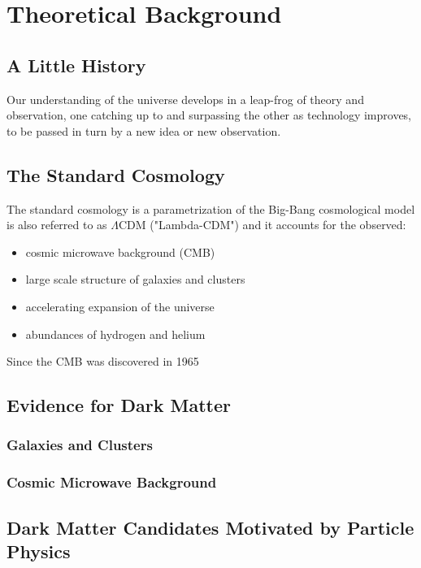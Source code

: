 \chapter{Theoretical Background }\label{theory} %



\section{A Little History}
Our understanding of the universe develops in a leap-frog of theory and observation, one catching up to and surpassing the other as technology improves, to be passed in turn by a new idea or new observation. 


\section{The Standard Cosmology}
The standard cosmology is a parametrization of the Big-Bang cosmological model is also referred to as $\Lambda$CDM ("Lambda-CDM") and it accounts for the observed:

\begin{itemize}
\item cosmic microwave background (CMB)
\item large scale structure of galaxies and clusters
\item accelerating expansion of the universe
\item abundances of hydrogen and helium
\end{itemize}

Since the CMB was discovered in 1965 

\section{Evidence for Dark Matter}
\subsection{Galaxies and Clusters}
\subsection{Cosmic Microwave Background}

\section{Dark Matter Candidates Motivated by Particle Physics}
